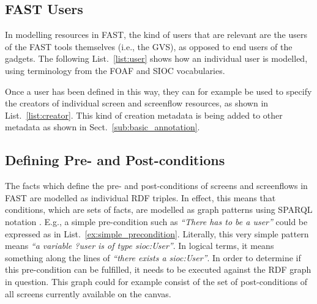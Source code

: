 \documentclass{article}
\begin{document}
\singlespacing
{}
\begin{figure}
	
\end{figure}
\doublespacing


\subsection{FAST Users} %
\label{sub:fast_users}

In modelling resources in FAST, the kind of users that are relevant are the users of the FAST tools themselves (i.e., the GVS), as opposed to end users of the gadgets. The following List.~\ref{list:user} shows how an individual user is modelled, using terminology from the FOAF and SIOC vocabularies.

\singlespacing
{}
\begin{figure}
	
\end{figure}
\doublespacing

Once a user has been defined in this way, they can for example be used to specify the creators of individual screen and screenflow resources, as shown in List.~\ref{list:creator}. This kind of creation metadata is being added to other metadata as shown in Sect.~\ref{sub:basic_annotation}.

\singlespacing
{}
\begin{figure}
	
\end{figure}
\doublespacing



\subsection{Defining Pre- and Post-conditions} %
\label{sub:defining_pre_and_post_conditions}

The facts which define the pre- and post-conditions of screens and screenflows in FAST are modelled as individual RDF triples. In effect, this means that conditions, which are sets of facts, are modelled as graph patterns using SPARQL notation \cite{sparql2008spec}. E.g., a simple pre-condition such as \emph{``There has to be a user''} could be expressed as in List.~\ref{ex:simple_precondition}. Literally, this very simple pattern means \emph{``a variable ?user is of type sioc:User''}. In logical terms, it means something along the lines of \emph{``there exists a sioc:User''}. In order to determine if this  pre-condition can be fulfilled, it needs to be executed against the RDF graph in question. This graph could for example consist of the set of post-conditions of all screens currently available on the canvas.
\end{document}
